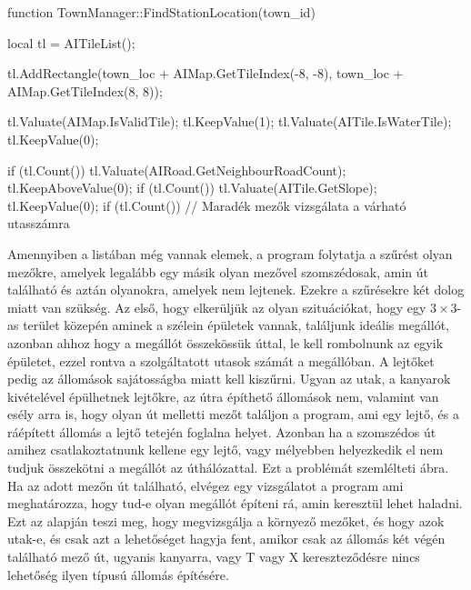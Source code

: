 \begin{cpp}
function TownManager::FindStationLocation(town_id) {
  local tl = AITileList();
  
  tl.AddRectangle(town_loc + AIMap.GetTileIndex(-8, -8),
   town_loc + AIMap.GetTileIndex(8, 8));
   
  tl.Valuate(AIMap.IsValidTile);
  tl.KeepValue(1);
  tl.Valuate(AITile.IsWaterTile);
  tl.KeepValue(0);
  
  if (tl.Count()) {
    tl.Valuate(AIRoad.GetNeighbourRoadCount);
  	tl.KeepAboveValue(0);
  	if (tl.Count()) {
      tl.Valuate(AITile.GetSlope);
      tl.KeepValue(0);
      if (tl.Count()) {
      	// Maradék mezők vizsgálata a várható utasszámra
      }
    }
  }
}
\end{cpp}

Amennyiben a listában még vannak elemek, a program folytatja a szűrést olyan mezőkre, amelyek legalább egy másik olyan mezővel szomszédosak, amin út található és aztán olyanokra, amelyek nem lejtenek. Ezekre a szűrésekre két dolog miatt van szükség. Az első, hogy elkerüljük az olyan szituációkat, hogy egy $3 \times 3$-as terület közepén aminek a szélein épületek vannak, találjunk ideális megállót, azonban ahhoz hogy a megállót összekössük úttal, le kell rombolnunk az egyik épületet, ezzel rontva a szolgáltatott utasok számát a megállóban. A lejtőket pedig az állomások sajátosságba miatt kell kiszűrni. Ugyan az utak, a kanyarok kivételével épülhetnek lejtőkre, az útra építhető állomások nem, valamint van esély arra is, hogy olyan út melletti mezőt találjon a program, ami egy lejtő, és a ráépített állomás a lejtő tetején foglalna helyet. Azonban ha a szomszédos út amihez csatlakoztatnunk kellene egy lejtő, vagy mélyebben helyezkedik el nem tudjuk összekötni a megállót az úthálózattal. Ezt a problémát szemlélteti  ábra. Ha az adott mezőn út található, elvégez egy vizsgálatot a program ami meghatározza, hogy tud-e olyan megállót építeni rá, amin keresztül lehet haladni. Ezt az alapján teszi meg, hogy megvizsgálja a környező mezőket, és hogy azok utak-e, és csak azt a lehetőséget hagyja fent, amikor csak az állomás két végén található mező út, ugyanis kanyarra, vagy T vagy X kereszteződésre nincs lehetőség ilyen típusú állomás építésére.

